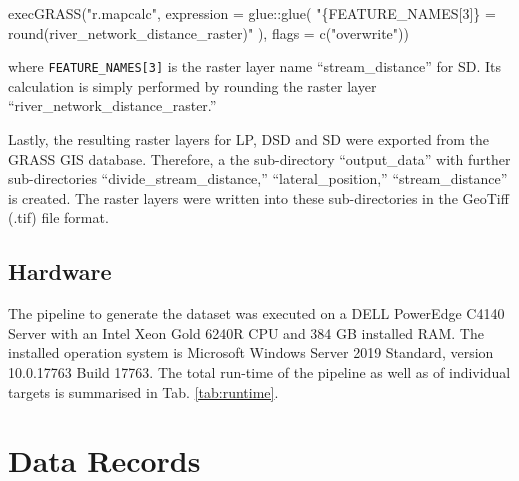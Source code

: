\documentclass[fleqn,10pt]{wlscirep}
\newenvironment{Shaded}{\begin{snugshade}}{\end{snugshade}}
\newcommand{\AttributeTok}[1]{\textcolor[rgb]{0.77,0.63,0.00}{#1}}
\newcommand{\FunctionTok}[1]{\textcolor[rgb]{0.00,0.00,0.00}{#1}}
\newcommand{\NormalTok}[1]{#1}
\newcommand{\SpecialCharTok}[1]{\textcolor[rgb]{0.00,0.00,0.00}{#1}}
\newcommand{\StringTok}[1]{\textcolor[rgb]{0.31,0.60,0.02}{#1}}
\begin{document}
\footnotesize

\begin{Shaded}
\begin{Highlighting}[]
\FunctionTok{execGRASS}\NormalTok{(}\StringTok{"r.mapcalc"}\NormalTok{,}
          \AttributeTok{expression =}\NormalTok{ glue}\SpecialCharTok{::}\FunctionTok{glue}\NormalTok{(}
            \StringTok{"\{FEATURE\_NAMES[3]\} = round(river\_network\_distance\_raster)"}
\NormalTok{            ),}
          \AttributeTok{flags =} \FunctionTok{c}\NormalTok{(}\StringTok{"overwrite"}\NormalTok{))}
\end{Highlighting}
\end{Shaded}

\normalsize
\noindent
where \texttt{FEATURE\_NAMES{[}3{]}} is the raster layer name ``stream\_distance'' for SD. Its calculation is simply performed by rounding the raster layer ``river\_network\_distance\_raster.''

Lastly, the resulting raster layers for LP, DSD and SD were exported from the GRASS GIS database. Therefore, a the sub-directory ``output\_data'' with further sub-directories ``divide\_stream\_distance,'' ``lateral\_position,'' ``stream\_distance'' is created. The raster layers were written into these sub-directories in the GeoTiff (.tif) file format.

\hypertarget{hardware}{%
\subsection*{Hardware}\label{hardware}}

The pipeline to generate the dataset was executed on a DELL PowerEdge C4140 Server with an Intel Xeon Gold 6240R CPU and 384 GB installed RAM. The installed operation system is Microsoft Windows Server 2019 Standard, version 10.0.17763 Build 17763. The total run-time of the pipeline as well as of individual targets is summarised in Tab. \ref{tab:runtime}.

\hypertarget{data-records}{%
\section*{Data Records}\label{data-records}}
\end{document}
